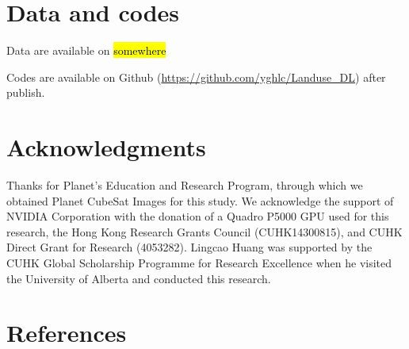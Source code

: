 \documentclass[preprint,12pt,authoryear]{elsarticle}
\begin{document}
\section{Data and codes}
\label{sec_data_codes}

Data are available on \hl{somewhere}  %

Codes are available on Github (\url{https://github.com/yghlc/Landuse\_DL}) after publish. 

\section{Acknowledgments}
\label{sec_acknowledgments}

Thanks for Planet’s Education and Research Program, through which we obtained Planet CubeSat Images for this study. We acknowledge the support of NVIDIA Corporation with the donation of a Quadro P5000 GPU used for this research, the Hong Kong Research Grants Council (CUHK14300815), and CUHK Direct Grant for Research (4053282). Lingcao Huang was supported by the CUHK Global Scholarship Programme for Research Excellence when he visited the University of Alberta and conducted this research.





\section{References}
\label{sec_reference}

 



%
%
\end{document}
